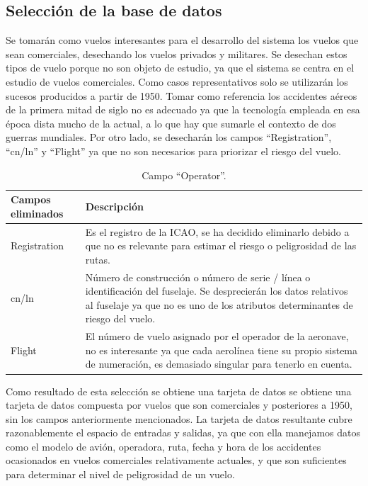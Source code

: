 \documentclass[a4paper,10pt]{article}
\begin{document}
\subsection{Selecci\'on de la base de datos}
Se tomar\'an como vuelos interesantes para el desarrollo del sistema los vuelos que sean comerciales, desechando los vuelos privados y militares. Se desechan estos tipos de vuelo porque no son objeto de estudio, ya que el sistema se centra en el estudio de vuelos comerciales.
\singlespacing
	Como casos representativos solo se utilizar\'an los sucesos producidos a partir de 1950. Tomar como referencia los accidentes a\'ereos de la primera mitad de siglo no es adecuado ya que la tecnolog\'ia empleada en esa \'epoca dista mucho de la actual, a lo que hay que sumarle el contexto de dos guerras mundiales.
    \singlespacing
	Por otro lado, se desechar\'an los campos ``Registration'', ``cn/ln'' y ``Flight'' ya que no son necesarios para priorizar el riesgo del vuelo.

\singlespacing
\begin{table}[htbp]
\centering
\begin{tabular}{p{4cm} p{8cm}}
\hline \hline
Campos eliminados & Descripci\'on\\
\hline \hline
Registration & Es el registro de la ICAO, se ha decidido eliminarlo debido a que no es relevante para estimar el riesgo o peligrosidad de las rutas.\\
\hline
cn/ln & N\'umero de construcci\'on o n\'umero de serie / l\'inea o identificaci\'on del fuselaje. Se desprecier\'an los datos relativos al fuselaje ya que no es uno de los atributos determinantes de riesgo del vuelo.\\
\hline
Flight & El n\'umero de vuelo asignado por el operador de la aeronave, no es interesante ya que cada aerol\'inea tiene su propio sistema de numeraci\'on, es demasiado singular para tenerlo en cuenta.\\
\hline \hline

\end{tabular}
\caption{Campo ``Operator''.}
\label{tabla:autores}
\end{table}

    \singlespacing
	Como resultado de esta selecci\'on se obtiene una tarjeta de datos se obtiene una tarjeta de datos compuesta por vuelos que son comerciales y posteriores a 1950, sin los campos anteriormente mencionados.
    \singlespacing
	La tarjeta de datos resultante cubre razonablemente el espacio de entradas y salidas, ya que con ella manejamos datos como el modelo de avi\'on, operadora, ruta, fecha y hora de los accidentes ocasionados en vuelos comerciales relativamente actuales, y que son suficientes para determinar el nivel de peligrosidad de un vuelo.
\end{document}
